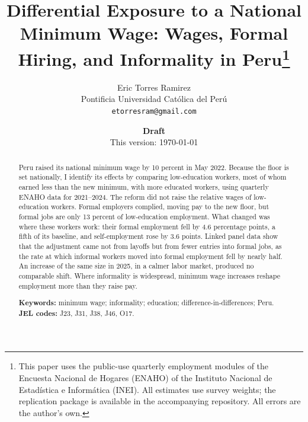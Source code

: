 \documentclass[12pt]{article}
\title{\textbf{Differential Exposure to a National Minimum Wage: Wages, Formal Hiring, and Informality in Peru}\thanks{This paper uses the public-use quarterly employment modules of the Encuesta Nacional de Hogares (ENAHO) of the Instituto Nacional de Estadística e Informática (INEI). All estimates use survey weights; the replication package is available in the accompanying repository. All errors are the author's own.}}
\author{Eric Torres Ramirez\\
  \small Pontificia Universidad Católica del Perú\\
  \small \texttt{etorresram@gmail.com}}
\date{\textbf{Draft}\\ This version: \today}
\begin{document}
\maketitle

\begin{abstract}
\noindent Peru raised its national minimum wage by 10 percent in May 2022. Because the floor is set nationally, I identify its effects by comparing low-education workers, most of whom earned less than the new minimum, with more educated workers, using quarterly ENAHO data for 2021--2024. The reform did not raise the relative wages of low-education workers. Formal employers complied, moving pay to the new floor, but formal jobs are only 13 percent of low-education employment. What changed was where these workers work: their formal employment fell by 4.6 percentage points, a fifth of its baseline, and self-employment rose by 3.6 points. Linked panel data show that the adjustment came not from layoffs but from fewer entries into formal jobs, as the rate at which informal workers moved into formal employment fell by nearly half. An increase of the same size in 2025, in a calmer labor market, produced no comparable shift. Where informality is widespread, minimum wage increases reshape employment more than they raise pay.

\medskip
\noindent\textbf{Keywords:} minimum wage; informality; education; difference-in-differences; Peru.\\
\noindent\textbf{JEL codes:} J23, J31, J38, J46, O17.
\end{abstract}

\newpage
{}












\newpage


\newpage
\appendix

\end{document}
